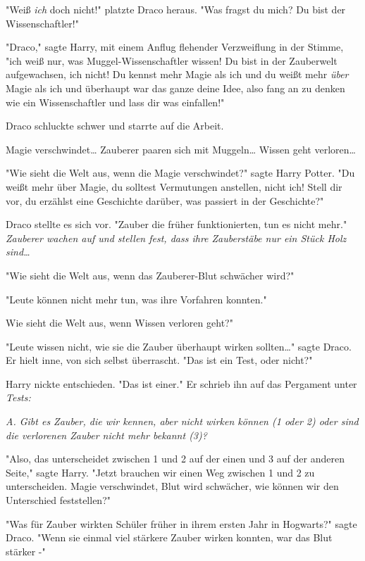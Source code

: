 {"Weiß \emph{ich} doch nicht!" platzte Draco heraus. "Was fragst du mich? Du bist der Wissenschaftler!"

"Draco," sagte Harry, mit einem Anflug flehender Verzweiflung in der Stimme, "ich weiß nur, was Muggel-Wissenschaftler wissen! Du bist in der Zauberwelt aufgewachsen, ich nicht! Du kennst mehr Magie als ich und du weißt mehr \emph{über} Magie als ich und überhaupt war das ganze deine Idee, also fang an zu denken wie ein Wissenschaftler und lass dir was einfallen!"

Draco schluckte schwer und starrte auf die Arbeit.

Magie verschwindet… Zauberer paaren sich mit Muggeln… Wissen geht verloren…

"Wie sieht die Welt aus, wenn die Magie verschwindet?" sagte Harry Potter. "Du weißt mehr über Magie, du solltest Vermutungen anstellen, nicht ich! Stell dir vor, du erzählst eine Geschichte darüber, was passiert in der Geschichte?"

Draco stellte es sich vor. "Zauber die früher funktionierten, tun es nicht mehr." \emph{Zauberer wachen auf und stellen fest, dass ihre Zauberstäbe nur ein Stück Holz sind…}

"Wie sieht die Welt aus, wenn das Zauberer-Blut schwächer wird?"

"Leute können nicht mehr tun, was ihre Vorfahren konnten."

Wie sieht die Welt aus, wenn Wissen verloren geht?"

"Leute wissen nicht, wie sie die Zauber überhaupt wirken sollten…" sagte Draco. Er hielt inne, von sich selbst überrascht. "Das ist ein Test, oder nicht?"

Harry nickte entschieden. "Das ist einer." Er schrieb ihn auf das Pergament unter \emph{Tests:}

\emph{A. Gibt es Zauber, die wir kennen, aber nicht wirken können (1 oder 2) oder sind die verlorenen Zauber nicht mehr bekannt (3)?}

"Also, das unterscheidet zwischen 1 und 2 auf der einen und 3 auf der anderen Seite," sagte Harry. "Jetzt brauchen wir einen Weg zwischen 1 und 2 zu unterscheiden. Magie verschwindet, Blut wird schwächer, wie können wir den Unterschied feststellen?"

"Was für Zauber wirkten Schüler früher in ihrem ersten Jahr in Hogwarts?" sagte Draco. "Wenn sie einmal viel stärkere Zauber wirken konnten, war das Blut stärker -"

}
